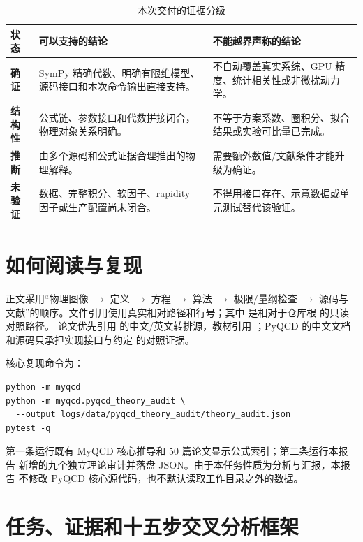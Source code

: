 \documentclass[UTF8,11pt,oneside]{ctexbook}
\newcommand{\verified}{\textcolor{evidence}{\textbf{确证}}}
\newcommand{\structural}{\textcolor{inferred}{\textbf{结构性}}}
\newcommand{\inferred}{\textcolor{inferred}{\textbf{推断}}}
\newcommand{\unverified}{\textcolor{warning}{\textbf{未验证}}}
\begin{document}
\begin{table}[htbp]
\centering
\caption{本次交付的证据分级}
\small
\begin{tabularx}{0.96\textwidth}{@{}P{2.4cm}Y Y@{}}
\toprule
状态 & 可以支持的结论 & 不能越界声称的结论\\
\midrule
\verified & SymPy 精确代数、明确有限维模型、源码接口和本次命令输出直接支持。
 & 不自动覆盖真实系综、GPU 精度、统计相关性或非微扰动力学。\\
\structural & 公式链、参数接口和代数拼接闭合，物理对象关系明确。
 & 不等于方案系数、圈积分、拟合结果或实验可比量已完成。\\
\inferred & 由多个源码和公式证据合理推出的物理解释。
 & 需要额外数值/文献条件才能升级为确证。\\
\unverified & 数据、完整积分、软因子、rapidity 因子或生产配置尚未闭合。
 & 不得用接口存在、示意数据或单元测试替代该验证。\\
\bottomrule
\end{tabularx}
\end{table}

\chapter*{如何阅读与复现}
正文采用“物理图像 $\to$ 定义 $\to$ 方程 $\to$ 算法 $\to$ 极限/量纲检查
$\to$ 源码与文献”的顺序。文件引用使用真实相对路径和行号；其中
 是相对于仓库根  的只读对照路径。
论文优先引用  的中文/英文转排源，教材引用
；PyQCD 的中文文档和源码只承担实现接口与约定
的对照证据。

核心复现命令为：
\begin{lstlisting}
python -m myqcd
python -m myqcd.pyqcd_theory_audit \
  --output logs/data/pyqcd_theory_audit/theory_audit.json
pytest -q
\end{lstlisting}
第一条运行既有 MyQCD 核心推导和 50 篇论文显示公式索引；第二条运行本报告
新增的九个独立理论审计并落盘 JSON。由于本任务性质为分析与汇报，本报告
不修改 PyQCD 核心源代码，也不默认读取工作目录之外的数据。

\tableofcontents
\mainmatter

\chapter{任务、证据和十五步交叉分析框架}
\end{document}
